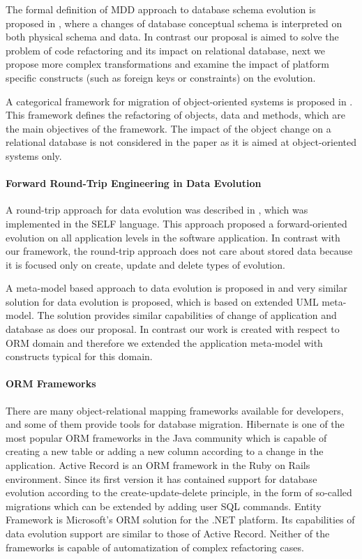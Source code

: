 \documentclass[runningheads]{comsis}
\begin{document}
The formal definition of MDD approach to database schema evolution is proposed in \cite{Aboulsamh:FormalModelingEvolution}, where a changes of database conceptual schema is interpreted on both physical schema and data. In contrast our proposal is aimed to solve the problem of code refactoring and its impact on relational database, next we propose more complex transformations and examine the impact of platform specific constructs (such as foreign keys or constraints) on the evolution. 

A categorical framework for migration of object-oriented systems is proposed in \cite{Schulz:CategoricalModel}. This framework defines the refactoring of objects, data and methods, which are the main objectives of the framework. The impact of the object change on a relational database is not considered in the paper as it is aimed at object-oriented systems only.

\paragraph{Forward Round-Trip Engineering in Data Evolution} A round-trip approach for data evolution was described in \cite{VanPaesschen:2005to}, which was implemented in the SELF language. This approach proposed a forward-oriented evolution on all application levels in the software application. In contrast with our framework, the round-trip approach does not care about stored data because it is focused only on create, update and delete types of evolution.

A meta-model based approach to data evolution is proposed in \cite{Aboulsamh:MetaModelBasedApproachToIsDataEvolution} and very similar solution for data evolution is proposed, which is based on extended UML meta-model. The solution provides similar capabilities of change of application and database as does our proposal. In contrast our work is created with respect to ORM domain and therefore we extended the application meta-model with constructs typical for this domain.

\paragraph{ORM Frameworks} There are many object-relational mapping frameworks available for developers, and some of them provide tools for database migration. Hibernate \cite{Hibernate} is one of the most popular ORM frameworks in the Java community which is capable of creating a new table or adding a new column according to a change in the application. Active Record \cite{Active_Record} is an ORM framework in the Ruby on Rails environment. Since its first version it has contained support for database evolution according to the create-update-delete principle, in the form of so-called migrations \cite{Rails:Migrations} which can be extended by adding user SQL commands. Entity Framework \cite{Entity_Framework} is Microsoft's ORM solution for the .NET platform. Its capabilities of data evolution support are similar to those of Active Record. Neither of the frameworks is capable of automatization of complex refactoring cases.
\end{document}
